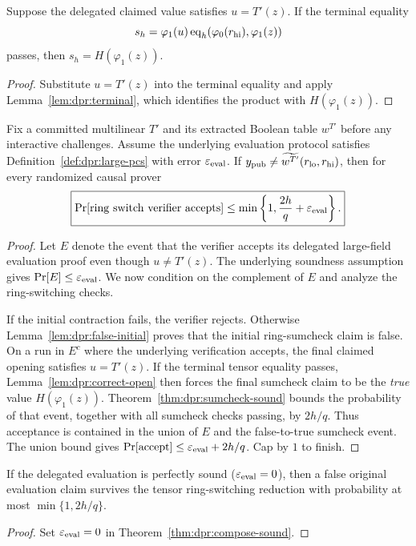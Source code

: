 \begin{lemma}\label{lem:dpr:correct-open}
Suppose the delegated claimed
value satisfies $u=T'(z)$.
If the terminal equality
\[
 s_h=\varphi_1(u)
 \operatorname{eq}_h(\varphi_0(r_{\rm hi}),\varphi_1(z))
\]
passes, then
$s_h=H(\varphi_1(z))$.
\end{lemma}
\begin{proof}
Substitute $u=T'(z)$ into
the terminal equality and apply
Lemma~\ref{lem:dpr:terminal},
which identifies the product
with $H(\varphi_1(z))$.
\end{proof}

\begin{theorem}\label{thm:dpr:compose-sound}
Fix a committed multilinear
$T'$ and its extracted Boolean
table $w^{T'}$ before any
interactive challenges.
Assume the underlying
evaluation protocol satisfies
Definition~\ref{def:dpr:large-pcs}
with error
$\varepsilon_{\rm eval}$.
If
$y_{\rm pub}\neq
\widetilde{w^{T'}}(r_{\rm lo},r_{\rm hi})$,
then for every randomized causal
prover
\[
 \boxed{
 \Pr[\mathrm{ring\ switch\ verifier\ accepts}]
 \leq\min\left\{1,\frac{2h}{q}
               +\varepsilon_{\rm eval}\right\}.}
\]
\end{theorem}
\begin{proof}
Let $E$ denote the event that
the verifier accepts its
delegated large-field evaluation
proof even though $u\neq T'(z)$.
The underlying soundness
assumption gives
$\Pr[E]\leq\varepsilon_{\rm eval}$.
We now condition on the
complement of $E$ and analyze
the ring-switching checks.

If the initial contraction
fails, the verifier rejects.
Otherwise Lemma~\ref{lem:dpr:false-initial}
proves that the initial
ring-sumcheck claim is false.
On a run in $E^c$ where the
underlying verification accepts,
the final claimed opening
satisfies $u=T'(z)$.
If the terminal tensor equality
passes, Lemma~\ref{lem:dpr:correct-open}
then forces the final sumcheck
claim to be the \emph{true}
value $H(\varphi_1(z))$.
Theorem~\ref{thm:dpr:sumcheck-sound}
bounds the probability of
that event, together with all
sumcheck checks passing, by
$2h/q$.
Thus acceptance is contained
in the union of $E$ and
the false-to-true sumcheck event.
The union bound gives
$\Pr[\mathrm{accept}]
\leq\varepsilon_{\rm eval}+2h/q$.
Cap by $1$ to finish.
\end{proof}

\begin{corollary}\label{cor:dpr:ideal-sound}
If the delegated evaluation
is perfectly sound
($\varepsilon_{\rm eval}=0$),
then a false original evaluation
claim survives the tensor
ring-switching reduction
with probability at most
$\min\{1,2h/q\}$.
\end{corollary}
\begin{proof}
Set $\varepsilon_{\rm eval}=0$
in Theorem~\ref{thm:dpr:compose-sound}.
\end{proof}

